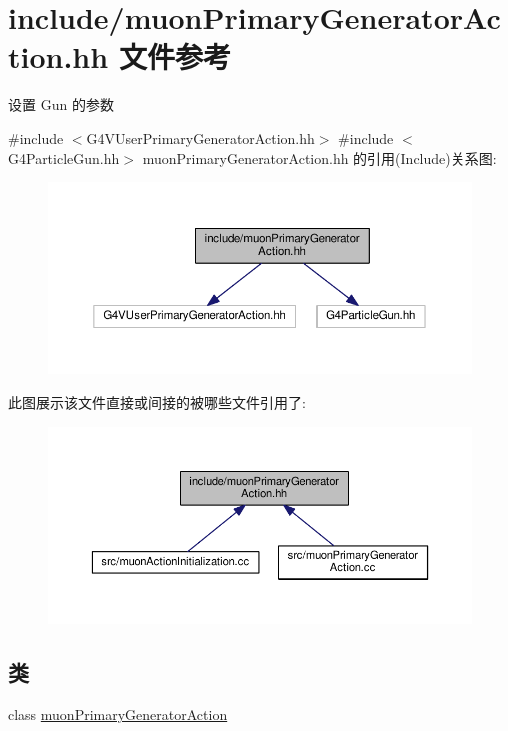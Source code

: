 \hypertarget{muonPrimaryGeneratorAction_8hh}{}\section{include/muon\+Primary\+Generator\+Action.hh 文件参考}
\label{muonPrimaryGeneratorAction_8hh}


设置 Gun 的参数  


{\ttfamily \#include $<$G4\+V\+User\+Primary\+Generator\+Action.\+hh$>$}\newline
{\ttfamily \#include $<$G4\+Particle\+Gun.\+hh$>$}\newline
muon\+Primary\+Generator\+Action.\+hh 的引用(Include)关系图\+:\nopagebreak
\begin{figure}[H]
\begin{center}
\leavevmode
\includegraphics[width=350pt]{muonPrimaryGeneratorAction_8hh__incl}
\end{center}
\end{figure}
此图展示该文件直接或间接的被哪些文件引用了\+:\nopagebreak
\begin{figure}[H]
\begin{center}
\leavevmode
\includegraphics[width=350pt]{muonPrimaryGeneratorAction_8hh__dep__incl}
\end{center}
\end{figure}
\subsection*{类}
\begin{DoxyCompactItemize}
\item 
class \hyperlink{classmuonPrimaryGeneratorAction}{muon\+Primary\+Generator\+Action}
\end{DoxyCompactItemize}


